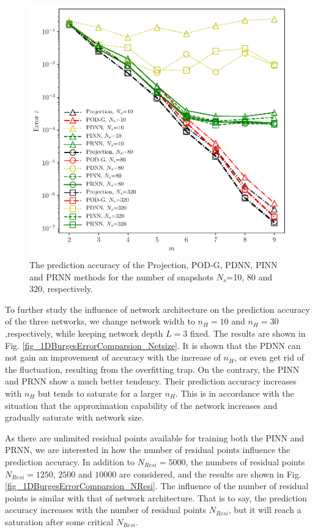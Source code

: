 \documentclass[preprint, 10pt]{elsarticle}
\begin{document}
\begin{figure}[!ht]
  \centering
  \includegraphics[width=12cm]{../../pythonNN/1DBurges/fig/ErrorComparsion_SampleNum.pdf}
\caption{The prediction accuracy of the Projection, POD-G, PDNN, PINN and PRNN methods for the number of snapshots $N_s$=10, 80 and 320, respectively.}
\label{fig_1DBurgesErrorComparsion_SampleNum}
\end{figure}


To further study the influence of network architecture on the prediction accuracy of the three networks, we change network width to $n_H=10$ and $n_H=30$,respectively, while keeping network depth $L=3$ fixed. The results are shown in Fig. \ref{fig_1DBurgesErrorComparsion_Netsize}. It is shown that the PDNN can not gain an improvement of accuracy with the increase of $n_H$, or even get rid of the fluctuation, resulting from the overfitting trap. On the contrary, the PINN and PRNN show a much better tendency. Their prediction accuracy increases with $n_H$ but tends to saturate for a larger $n_H$. This is in accordance with the situation that the approximation capability of the network increases and gradually saturate with network size.

As there are unlimited residual points available for training both the PINN and PRNN, we are interested in how the number of residual points influence the prediction accuracy. In addition to $N_{Resi}=5000$, the numbers of residual points $N_{Resi}=1250$, $2500$ and $10000$ are considered, and the results are shown in Fig. \ref{fig_1DBurgesErrorComparsion_NResi}. The influence of the number of residual points is similar with that of network architecture. That is to say, the prediction accuracy increases with the number of residual points $N_{Resi}$, but it will reach a saturation after some critical $N_{Resi}$.
\end{document}
